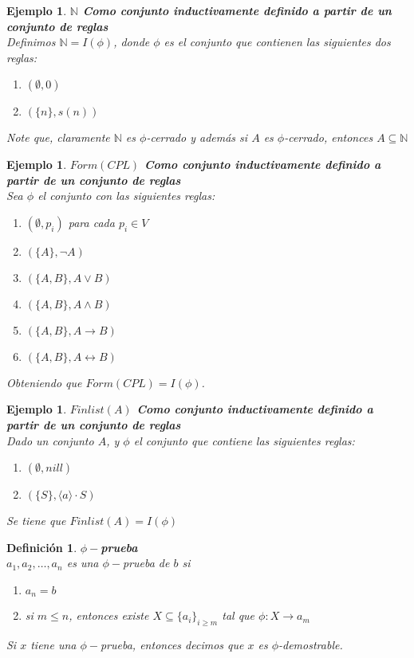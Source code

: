 \documentclass[executivepaper]{article}
\newtheorem{defi}[propo]{Definición}
\newtheorem{ejemplo}[propo]{Ejemplo}
\newcommand{\N}{\mathbb{N}}
\begin{document}
\begin{ejemplo}\textbf{$\N$ Como conjunto inductivamente definido a partir de un conjunto de reglas}\\
Definimos $\N = I(\phi)$, donde $\phi$ es el conjunto que contienen las siguientes dos reglas:
\begin{enumerate}
\item $(\emptyset,0)$
\item $(\{n\},s(n))$
\end{enumerate}
Note que, claramente $\N$ es $\phi$-cerrado y además si $A$ es $\phi$-cerrado, entonces $A \subseteq \N$
\end{ejemplo}

\begin{ejemplo}\textbf{$Form(CPL)$ Como conjunto inductivamente definido a partir de un conjunto de reglas}\\
Sea $\phi$ el conjunto con las siguientes reglas:
\begin{enumerate}
    \item $(\emptyset, p_i)$ para cada $p_i \in V$
    \item $(\{A\}, \neg A)$
    \item $(\{A, B\}, A \lor B)$
    \item $(\{A, B\}, A \land B)$
    \item $(\{A, B\}, A \rightarrow B)$
    \item $(\{A, B\}, A \leftrightarrow B)$
\end{enumerate}
Obteniendo que $Form(CPL) = I(\phi)$.
\end{ejemplo}

\begin{ejemplo}\textbf{$Finlist(A)$ Como conjunto inductivamente definido a partir de un conjunto de reglas}\\
Dado un conjunto $A$, y $\phi$ el conjunto que contiene las siguientes reglas:
\begin{enumerate}
    \item $(\emptyset, nill)$
    \item $(\{S\},\langle a \rangle\cdot S)$ 
\end{enumerate}
Se tiene que $Finlist(A) = I(\phi)$
\end{ejemplo}

\begin{defi}
\textbf{$\phi-$prueba}\\
$a_1, a_2, \ldots, a_n$ es una $\phi-$prueba de $b$ si
\begin{enumerate}
\item $a_n = b$
\item si $m \leq n$, entonces existe $X\subseteq \{a_i\}_{i\geq m}$ tal que $\phi : X \rightarrow a_m$
\end{enumerate}
Si $x$ tiene una $\phi-$prueba, entonces decimos que $x$ es $\phi$-demostrable.
\end{defi}
\end{document}
